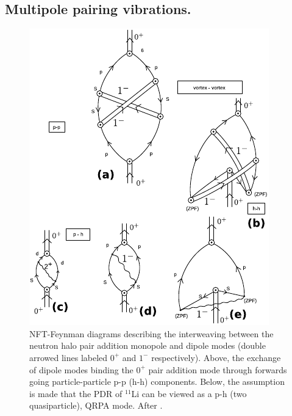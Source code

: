 \begin{subappendices}
\section{Multipole pairing vibrations.}\label{App6G}
\begin{figure}
\includegraphics[width=\textwidth]{C8/figsC8/figA1_corr.pdf}
\caption{ NFT-Feynman diagrams describing the interweaving between the neutron halo pair addition monopole and dipole modes
(double arrowed lines labeled $0^+$ and $1^-$ respectively). Above, the exchange of dipole modes binding the $0^+$ pair addition mode through  forwards going particle-particle p-p (h-h) components. Below,  the assumption is made that the PDR of $^{11}$Li can be viewed as a p-h (two quasiparticle), QRPA mode. After \cite{Broglia:16}.}\label{fig6.I.1}
\end{figure}


\end{subappendices}
